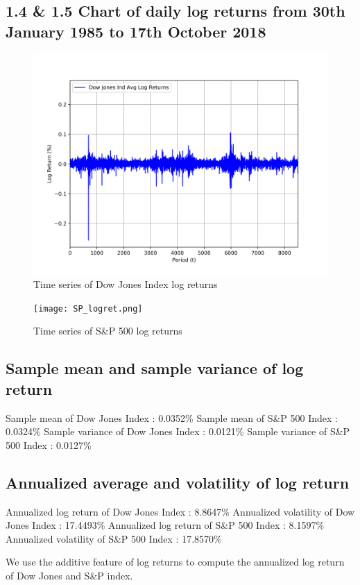 \documentclass[a4paper]{article}
\begin{document}
	\newpage
	\subsection*{1.4 \& 1.5 \quad Chart of daily log returns from 30th January 1985 to 17th October 2018}
	
	\begin{figure}[h!]
		\centering
		\includegraphics[width=0.8\linewidth]{DJI_logret.png}
		\caption{Time series of Dow Jones Index log returns}
	\end{figure}
	\begin{figure}[h!]
		\centering
		\texttt{[image: SP\_logret.png]}
		\caption{Time series of S\&P 500 log returns}
	\end{figure}
	
	\setcounter{subsection}{5}
	\subsection{Sample mean and sample variance of log return}
	
	\begin{flushleft}
		Sample mean of Dow Jones Index : 0.0352\%  \linebreak 
		Sample mean of S\&P 500 Index : 0.0324\%  \linebreak 
		Sample variance of Dow Jones Index : 0.0121\%  \linebreak 
		Sample variance of S\&P 500 Index : 0.0127\%  \linebreak 
	\end{flushleft}
	
	\subsection{Annualized average and volatility of log return}
	\begin{flushleft}
		Annualized log return of Dow Jones Index : 8.8647\% \linebreak 
		Annualized volatility of Dow Jones Index : 17.4493\% \linebreak 
		Annualized log return of S\&P 500 Index : 8.1597\% \linebreak 
		Annualized volatility of S\&P 500 Index : 17.8570\% \linebreak 
	\end{flushleft}
	\vspace{-7mm}
	We use the additive feature of log returns to compute the annualized log return of Dow Jones and S\&P index. 
	
\end{document}
